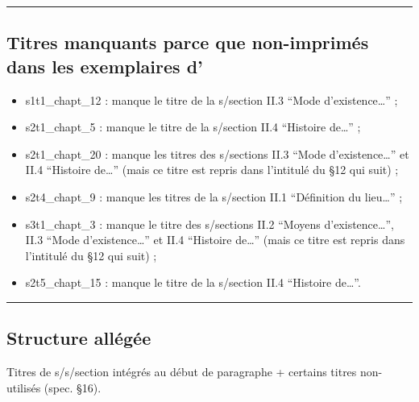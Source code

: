 \begin{center}\rule{3in}{0.4pt}\end{center}

\subsection[Titres non-imprimés]{Titres manquants parce que non-imprimés dans les exemplaires
d'\ia}\label{titre-non-imprimes}

\begin{itemize}
\item
  s1t1\_chapt\_12 : manque le titre de la s/section II.3 ``Mode
  d'existence\ldots{}'' ;
\item
  s2t1\_chapt\_5 : manque le titre de la s/section II.4 ``Histoire
  de\ldots{}'' ;
\item
  s2t1\_chapt\_20 : manque les titres des s/sections II.3 ``Mode
  d'existence\ldots{}'' et II.4 ``Histoire de\ldots{}'' (mais ce titre
  est repris dans l'intitulé du §12 qui suit) ;
\item
  s2t4\_chapt\_9 : manque les titres de la s/section II.1 ``Définition
  du lieu\ldots{}'' ;
\item
  s3t1\_chapt\_3 : manque le titre des s/sections II.2 ``Moyens
  d'existence\ldots{}'', II.3 ``Mode d'existence\ldots{}'' et II.4
  ``Histoire de\ldots{}'' (mais ce titre est repris dans l'intitulé du
  §12 qui suit) ;
\item
  s2t5\_chapt\_15 : manque le titre de la s/section II.4 ``Histoire
  de\ldots{}''.
\end{itemize}

\begin{center}\rule{3in}{0.4pt}\end{center}

\subsection{Structure allégée}\label{structure-alluxe9guxe9e}

Titres de s/s/section intégrés au début de paragraphe + certains titres
non-utilisés (spec. §16).

